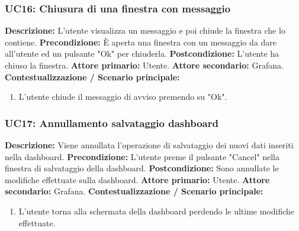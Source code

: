                 \subsubsection{UC16: Chiusura di una finestra con messaggio}
                    \textbf{Descrizione:} L'utente visualizza un messaggio e poi chiude la finestra che lo contiene.
                    \newline
                    \textbf{Precondizione:} \`E aperta una finestra con un messaggio da dare all'utente ed un pulsante "Ok" per chiuderla.
                    \newline
                    \textbf{Postcondizione:} L'utente ha chiuso la finestra.
                    \newline
                    \textbf{Attore primario:} Utente.
                    \newline
                    \textbf{Attore secondario:} Grafana.
                    \newline
                    \textbf{Contestualizzazione / Scenario principale:} \begin{enumerate}
                            \item L'utente chiude il messaggio di avviso premendo su "Ok".
                        \end{enumerate}
                        
                \subsubsection{UC17: Annullamento salvataggio dashboard}
                    \textbf{Descrizione:} Viene annullata l'operazione di salvataggio dei nuovi dati inseriti nella dashboard.
                    \newline
                    \textbf{Precondizione:} L'utente preme il pulsante "Cancel" nella finestra di salvataggio della dashboard. 
                    \newline
                    \textbf{Postcondizione:} Sono annullate le modifiche effettuate sulla dashboard.
                    \newline
                    \textbf{Attore primario:} Utente.
                    \newline
                    \textbf{Attore secondario:} Grafana.
                    \newline
                    \textbf{Contestualizzazione / Scenario principale:} \begin{enumerate}
                            \item L'utente torna alla schermata della dashboard perdendo le ultime modifiche effettuate.
                        \end{enumerate}
                        
